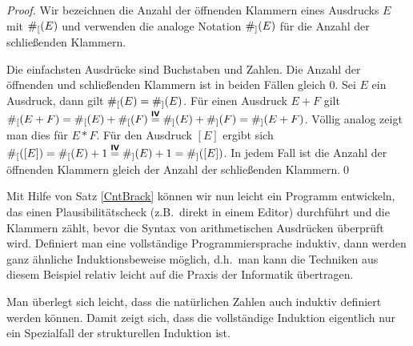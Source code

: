 \begin{proof}
Wir bezeichnen die Anzahl der öffnenden Klammern eines Ausdrucks $E$
mit $\#_[(E)$ und verwenden die analoge Notation $\#_](E)$ für die
Anzahl der schließenden Klammern.

\induproof%
{
Die einfachsten Ausdrücke sind Buchstaben und Zahlen. Die Anzahl der
öffnenden und schließenden Klammern ist in beiden Fällen gleich $0$.
}
{
Sei $E$ ein Ausdruck, dann gilt $\#_[(E) = \#_](E)$.
}
{
 Für einen Ausdruck $E + F$ gilt $\#_[(E + F) = \#_[(E
) +
 \#_[(F) \stackrel{\text{\textbf{\textsf{IV}}}}{=} \#_](E) +
 \#_](F) = \#_](E + F)$. Völlig analog zeigt man dies für $E *
 F$. Für den Ausdruck $[E]$ ergibt sich $\#_[([E]) = \#_[(E) + 1
 \stackrel{\text{\textbf{\textsf{IV}}}}{=} \#_](E) + 1 = \#_]([E])$.
 In jedem Fall ist die Anzahl der öffnenden Klammern gleich der Anzahl
 der schließenden Klammern.\qed
}
\end{proof}

\bigskip

Mit Hilfe von Satz \ref{CntBrack} können wir nun leicht ein Programm
entwickeln, das einen Plausibilitätscheck (z.B.~direkt in einem Editor)
durchführt und die Klammern zählt, bevor die Syntax von arithmetischen
Ausdrücken überprüft wird. Definiert man eine vollständige
Programmiersprache induktiv, dann werden ganz ähnliche
Induktionsbeweise möglich, d.h.~man kann die Techniken aus diesem
Beispiel relativ leicht auf die Praxis der Informatik übertragen.

Man überlegt sich leicht, dass die natürlichen Zahlen auch induktiv
definiert werden können. Damit zeigt sich, dass die vollständige
Induktion eigentlich nur ein Spezialfall der strukturellen Induktion
ist.
